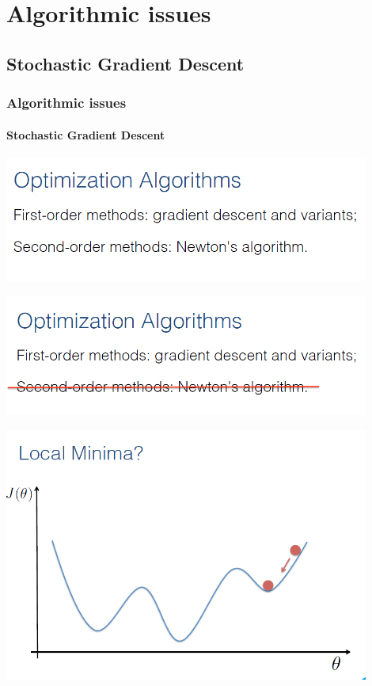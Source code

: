 \documentclass{beamer}
\begin{document}
\section{Algorithmic issues}
\subsection{Stochastic Gradient Descent}
\begin{frame}
\frametitle{Algorithmic issues}
\framesubtitle{Stochastic Gradient Descent}
\includegraphics[width=0.9\textwidth]{images/optim_1.PNG} \\
\end{frame}
\begin{frame}
\includegraphics[width=0.9\textwidth]{images/optim_2.PNG} \\
\end{frame}
\begin{frame}
\includegraphics[width=0.9\textwidth]{images/optim_3.PNG} \\
\end{frame}
\end{document}
